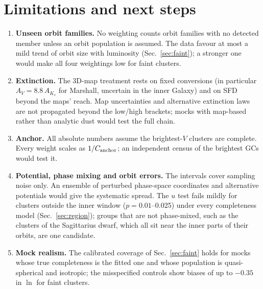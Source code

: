 \documentclass[11pt,a4paper]{article}
\begin{document}
\section{Limitations and next steps}
\label{sec:limits}

\begin{enumerate}
\item \textbf{Unseen orbit families.} No weighting counts orbit families with no detected member
unless an orbit population is assumed. The data favour at most a mild trend of orbit size with
luminosity (Sec.~\ref{sec:faint}); a stronger one would make all four weightings low for faint clusters.
\item \textbf{Extinction.} The 3D-map treatment rests on fixed conversions (in particular
$A_V = 8.8\,A_{K_s}$ for Marshall, uncertain in the inner Galaxy) and on SFD beyond the maps' reach.
Map uncertainties and alternative extinction laws are not propagated beyond the low/high brackets;
mocks with map-based rather than analytic dust would test the full chain.
\item \textbf{Anchor.} All absolute numbers assume the brightest-$V$ clusters are complete. Every weight
scales as $1/C_{\rm anchor}$; an independent census of the brightest GCs would test it.
\item \textbf{Potential, phase mixing and orbit errors.} The intervals cover sampling noise only. An
ensemble of perturbed phase-space coordinates and alternative potentials would give the systematic
spread. The $u$ test fails mildly for clusters outside the inner window ($p=0.01$--0.025) under every
completeness model (Sec.~\ref{sec:region}); groups that are not phase-mixed, such as the clusters of
the Sagittarius dwarf, which all sit near the inner parts of their orbits, are one candidate.
\item \textbf{Mock realism.} The calibrated coverage of Sec.~\ref{sec:faint} holds for mocks whose true
completeness is the fitted one and whose population is quasi-spherical and isotropic; the misspecified
controls show biases of up to $-0.35$ in $\ln$ for faint clusters.
\end{enumerate}
\end{document}
